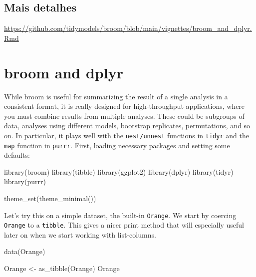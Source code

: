 \documentclass[
]{book}
\newenvironment{Shaded}{\begin{snugshade}}{\end{snugshade}}
\newcommand{\FunctionTok}[1]{\textcolor[rgb]{0.00,0.00,0.00}{#1}}
\newcommand{\NormalTok}[1]{#1}
\newcommand{\OtherTok}[1]{\textcolor[rgb]{0.56,0.35,0.01}{#1}}
\begin{document}
\hypertarget{mais-detalhes}{%
\section{Mais detalhes}\label{mais-detalhes}}

\url{https://github.com/tidymodels/broom/blob/main/vignettes/broom_and_dplyr.Rmd}

\hypertarget{broom-and-dplyr}{%
\chapter{broom and dplyr}\label{broom-and-dplyr}}

While broom is useful for summarizing the result of a single analysis in a consistent format, it is really designed for high-throughput applications, where you must combine results from multiple analyses. These could be subgroups of data, analyses using different models, bootstrap replicates, permutations, and so on. In particular, it plays well with the \texttt{nest/unnest} functions in \texttt{tidyr} and the \texttt{map} function in \texttt{purrr}. First, loading necessary packages and setting some defaults:

\begin{Shaded}
\begin{Highlighting}[]
\FunctionTok{library}\NormalTok{(broom)}
\FunctionTok{library}\NormalTok{(tibble)}
\FunctionTok{library}\NormalTok{(ggplot2)}
\FunctionTok{library}\NormalTok{(dplyr)}
\FunctionTok{library}\NormalTok{(tidyr)}
\FunctionTok{library}\NormalTok{(purrr)}

\FunctionTok{theme\_set}\NormalTok{(}\FunctionTok{theme\_minimal}\NormalTok{())}
\end{Highlighting}
\end{Shaded}

Let's try this on a simple dataset, the built-in \texttt{Orange}. We start by coercing \texttt{Orange} to a \texttt{tibble}. This gives a nicer print method that will especially useful later on when we start working with list-columns.

\begin{Shaded}
\begin{Highlighting}[]
\FunctionTok{data}\NormalTok{(Orange)}

\NormalTok{Orange }\OtherTok{\textless{}{-}} \FunctionTok{as\_tibble}\NormalTok{(Orange)}
\NormalTok{Orange}
\end{Highlighting}
\end{Shaded}
\end{document}
